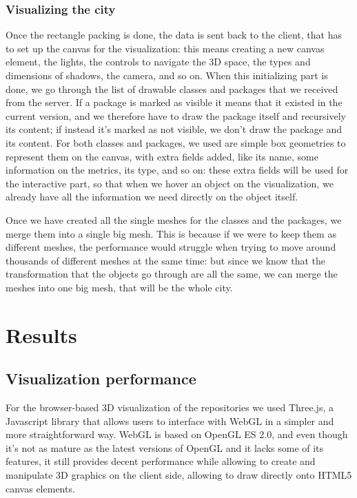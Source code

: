 \documentclass[]{usiinfbachelorproject}
\begin{document}
\subsubsection{Visualizing the city} \label{Visualizing the city}
Once the rectangle packing is done, the data is sent back to the client, that has to set up the canvas for the visualization: this means creating a new canvas element, the lights, the controls to navigate the 3D space, the types and dimensions of shadows, the camera, and so on.
When this initializing part is done, we go through the list of drawable classes and packages that we received from the server. If a package is marked as visible it means that it existed in the current version, and we therefore have to draw the package itself and recursively its content; if instead it's marked as not visible, we don't draw the package and its content.
For both classes and packages, we used are simple box geometries to represent them on the canvas, with extra fields added, like its name, some information on the metrics, its type, and so on: these extra fields will be used for the interactive part, so that when we hover an object on the visualization, we already have all the information we need directly on the object itself.

Once we have created all the single meshes for the classes and the packages, we merge them into a single big mesh.
This is because if we were to keep them as different meshes, the performance would struggle when trying to move around thousands of different meshes at the same time: but since we know that the transformation that the objects go through are all the same, we can merge the meshes into one big mesh, that will be the whole city.

\section{Results} \label{Results}

\subsection{Visualization performance} \label{Visualization performance}

For the browser-based 3D visualization of the repositories we used Three.js, a Javascript library that allows users to interface with WebGL in a simpler and more straightforward way. WebGL is based on OpenGL ES 2.0, and even though it's not as mature as the latest versions of OpenGL and it lacks some of its features, it still provides decent performance while allowing to create and manipulate 3D graphics on the client side, allowing to draw directly onto HTML5 canvas elements.
\end{document}
